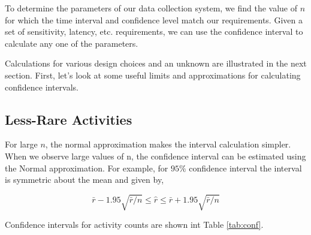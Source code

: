 \documentclass{article}
\begin{document}
To determine the parameters of our data collection system, we find the value of $n$ for which the time interval and confidence level match our requirements.  Given a set of sensitivity, latency, etc. requirements, we can use the confidence interval to calculate any one of the parameters. 

Calculations for various design choices and an unknown are illustrated in the next section.  First, let's look at some useful limits and approximations for calculating confidence intervals.

\subsection{Less-Rare Activities}

For large $n$, the normal approximation makes the interval calculation simpler. When we observe large values of n, the confidence interval can be estimated using the Normal approximation. For example, for $95\%$ confidence interval the interval is symmetric about the mean and given by,

\begin{equation}
    \label{eq:largenconf}
    \bar{r} - 1.95 \sqrt{\bar{r}/n} \leq \hat{r} \leq \bar{r} + 1.95 \sqrt{\bar{r}/n}
\end{equation}

Confidence intervals for activity counts are shown int Table \ref{tab:conf}.
\end{document}

